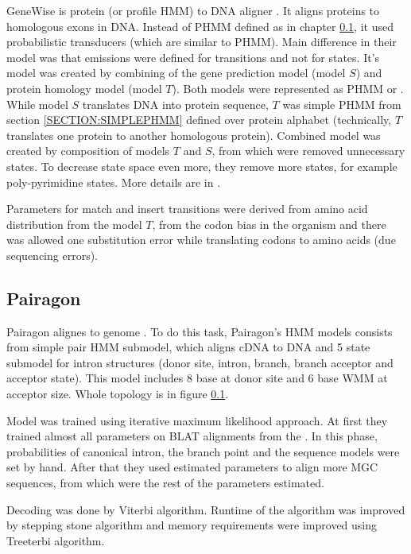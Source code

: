 GeneWise is protein (or profile HMM) to DNA aligner \cite{Birney2004}. It aligns
proteins to homologous exons in DNA. Instead of PHMM defined as in chapter
\ref{}, it used probabilistic transducers (which are similar to PHMM). Main
difference in their model was that emissions were defined for transitions and
not for states.  It's model was created by combining of the gene prediction
model (model $S$) and protein homology model (model $T$). Both models were
represented as PHMM or . While model $S$ translates DNA into protein sequence, $T$ was simple PHMM
from section \ref{SECTION:SIMPLEPHMM} defined over protein alphabet
(technically, $T$ translates one protein to another homologous protein).
Combined model was created by composition of models $T$ and $S$, from which were
removed unnecessary states. To decrease state space even more, they remove more
states, for example poly-pyrimidine states. More details are in
\cite{Birney2004}.

Parameters for match and insert transitions were derived from amino acid
distribution from the model $T$, from the codon bias in the organism and there
was allowed one substitution error while translating codons to amino acids (due
sequencing errors).
 
\subsection{Pairagon}

Pairagon alignes  to  genome \cite{Pairagon2009}.
To do this task, Pairagon's HMM models consists from simple pair HMM submodel,
which aligns cDNA to DNA and 5 state submodel for intron structures (donor site,
intron, branch, branch acceptor and acceptor state). This model includes 8 base
 at donor site and 6 base WMM at
acceptor size. Whole topology is in figure \ref{}.

Model was trained using iterative maximum likelihood approach. At first they
trained almost all parameters on BLAT alignments from the
. In this phase, probabilities of
canonical intron, the branch point and the sequence models were set by hand.
After that they used estimated parameters to align more MGC sequences, from
which were the rest of the parameters estimated.

Decoding was done by Viterbi algorithm. Runtime of the algorithm was improved by
stepping stone algorithm \cite{} and memory requirements were improved using
Treeterbi algorithm. 


